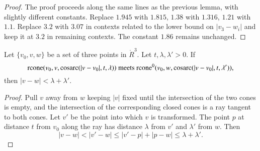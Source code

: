 \begin{proof}
The proof proceeds along the same lines as the previous lemma, with
slightly different constants. Replace $1.945$ with $1.815$, $1.38$ with
$1.316$, $1.21$ with $1.1$. Replace $3.2$ with $3.07$ in contexts related
to the lower bound on $|v_3-w_i|$ and keep it at $3.2$ in
remaining contexts. The constant $1.86$ remains unchanged.
\end{proof}

\begin{lemma}\label{tarski:cone-meet}
Let $\{v_0,v,w\}$ be a set of three points in $\ring{R}^3$.  Let $t,\lambda,\lambda'>0$.  If 
$${\operatorname{rcone}}(v_0,v,\operatorname{cosarc}(|v-v_0|,t,\lambda)) \text{ meets }
{\operatorname{rcone}}^0(v_0,w,\operatorname{cosarc}(|v-v_0|,t,\lambda')),$$ then
$|v-w| < \lambda+\lambda'$.
\end{lemma}

\begin{proof} Pull $v$ away from $w$ keeping $|v|$ fixed
until the intersection of the two
cones is empty, and the intersection of the corresponding closed cones
is a ray tangent to both cones.  Let $v'$ be the point into which
$v$ is transformed.  The point $p$ at distance $t$ from $v_0$ along
the ray has distance $\lambda$ from $v'$ and $\lambda'$ from $w$.
Then
  $$
  |v-w| < |v'-w| \le |v'-p| + |p-w| \le \lambda + \lambda'.
  $$
\end{proof}


